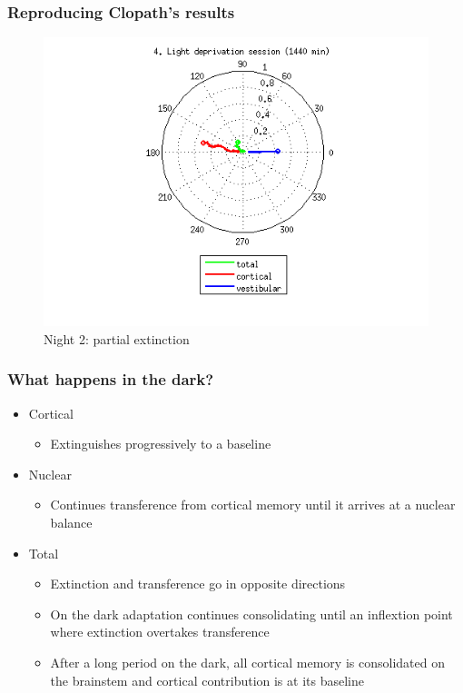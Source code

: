 \documentclass[10pt, compress]{beamer}
\begin{document}
\begin{frame}[fragile]
  \frametitle{Reproducing Clopath's results}
  \begin{figure}
    \includegraphics[scale=0.5]{images/longnoi_22.png}
    \caption{Night 2: partial extinction}
  \end{figure}
\end{frame}

\begin{frame}[fragile]
  \frametitle{What happens in the dark?}
  \begin{itemize}
    \item Cortical
      \begin{itemize}
        \item Extinguishes progressively to a baseline
      \end{itemize}
    \item Nuclear
      \begin{itemize}
        \item Continues transference from cortical memory until it arrives at a nuclear balance
      \end{itemize}
    \item Total
      \begin{itemize}
        \item Extinction and transference go in opposite directions
        \item On the dark adaptation continues consolidating until an inflextion point where extinction overtakes transference
        \item After a long period on the dark, all cortical memory is consolidated on the brainstem and cortical contribution is at its baseline
      \end{itemize}
  \end{itemize}
\end{frame}
\end{document}
